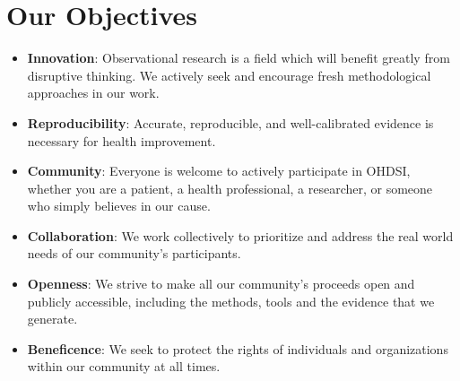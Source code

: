 \documentclass[11pt]{book}
\theoremstyle{definition}
\theoremstyle{definition}
\theoremstyle{definition}
\theoremstyle{remark}
\begin{document}
\hypertarget{our-objectives}{%
\section{Our Objectives}\label{our-objectives}}

\begin{itemize}
\item
  \textbf{Innovation}: Observational research is a field which will benefit greatly from disruptive thinking. We actively seek and encourage fresh methodological approaches in our work.
\item
  \textbf{Reproducibility}: Accurate, reproducible, and well-calibrated evidence is necessary for health improvement.
\item
  \textbf{Community}: Everyone is welcome to actively participate in OHDSI, whether you are a patient, a health professional, a researcher, or someone who simply believes in our cause. 
\item
  \textbf{Collaboration}: We work collectively to prioritize and address the real world needs of our community's participants.
\item
  \textbf{Openness}: We strive to make all our community's proceeds open and publicly accessible, including the methods, tools and the evidence that we generate.
\item
  \textbf{Beneficence}: We seek to protect the rights of individuals and organizations within our community at all times.
\end{itemize}
\end{document}
